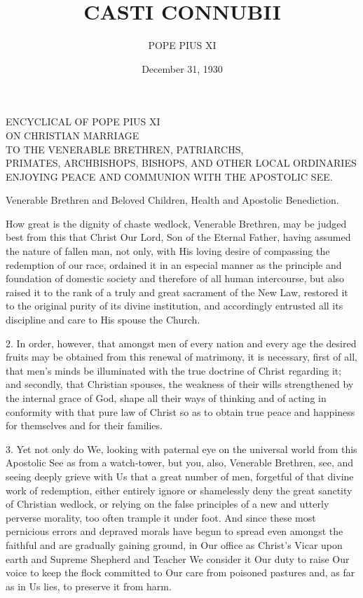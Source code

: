 \documentclass[12pt,a4paper]{book}
\title{CASTI CONNUBII}
\author{POPE PIUS XI}
\date{December 31, 1930}
\begin{document}
\maketitle

\begin{center}
ENCYCLICAL OF POPE PIUS XI \\
ON CHRISTIAN MARRIAGE \\
TO THE VENERABLE BRETHREN, PATRIARCHS, \\
PRIMATES, ARCHBISHOPS, BISHOPS, AND OTHER LOCAL ORDINARIES \\
ENJOYING PEACE AND COMMUNION WITH THE APOSTOLIC SEE.
\end{center}

Venerable Brethren and Beloved Children, Health and Apostolic Benediction.

How great is the dignity of chaste wedlock, Venerable Brethren, may be judged best from this that Christ Our Lord, Son of the Eternal Father, having assumed the nature of fallen man, not only, with His loving desire of compassing the redemption of our race, ordained it in an especial manner as the principle and foundation of domestic society and therefore of all human intercourse, but also raised it to the rank of a truly and great sacrament of the New Law, restored it to the original purity of its divine institution, and accordingly entrusted all its discipline and care to His spouse the Church.

2. In order, however, that amongst men of every nation and every age the desired fruits may be obtained from this renewal of matrimony, it is necessary, first of all, that men's minds be illuminated with the true doctrine of Christ regarding it; and secondly, that Christian spouses, the weakness of their wills strengthened by the internal grace of God, shape all their ways of thinking and of acting in conformity with that pure law of Christ so as to obtain true peace and happiness for themselves and for their families.

3. Yet not only do We, looking with paternal eye on the universal world from this Apostolic See as from a watch-tower, but you, also, Venerable Brethren, see, and seeing deeply grieve with Us that a great number of men, forgetful of that divine work of redemption, either entirely ignore or shamelessly deny the great sanctity of Christian wedlock, or relying on the false principles of a new and utterly perverse morality, too often trample it under foot. And since these most pernicious errors and depraved morals have begun to spread even amongst the faithful and are gradually gaining ground, in Our office as Christ's Vicar upon earth and Supreme Shepherd and Teacher We consider it Our duty to raise Our voice to keep the flock committed to Our care from poisoned pastures and, as far as in Us lies, to preserve it from harm.
\end{document}
